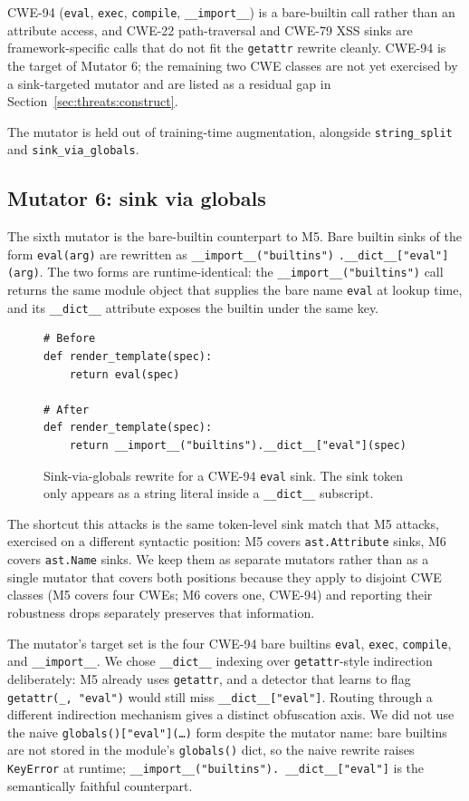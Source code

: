 CWE-94 (\texttt{eval}, \texttt{exec}, \texttt{compile},
\texttt{\_\_import\_\_}) is a bare-builtin call rather than an
attribute access, and CWE-22 path-traversal and CWE-79 XSS sinks
are framework-specific calls that do not fit the
\texttt{getattr} rewrite cleanly. CWE-94 is the target of Mutator 6;
the remaining two CWE classes are not yet exercised by a
sink-targeted mutator and are listed as a residual gap in
Section~\ref{sec:threats:construct}.

The mutator is held out of training-time augmentation, alongside
\texttt{string\_split} and \texttt{sink\_via\_globals}.

\subsection{Mutator 6: sink via globals}
\label{sec:method:svg}

The sixth mutator is the bare-builtin counterpart to M5. Bare
builtin sinks of the form \texttt{eval(arg)} are rewritten as
\texttt{\_\_import\_\_("builtins")} \texttt{.\_\_dict\_\_["eval"](arg)}.
The two forms are runtime-identical: the
\texttt{\_\_import\_\_("builtins")} call returns the same module
object that supplies the bare name \texttt{eval} at lookup time, and
its \texttt{\_\_dict\_\_} attribute exposes the builtin under the
same key.

\begin{figure}[h]
\begin{verbatim}
# Before
def render_template(spec):
    return eval(spec)

# After
def render_template(spec):
    return __import__("builtins").__dict__["eval"](spec)
\end{verbatim}
\caption{Sink-via-globals rewrite for a CWE-94 \texttt{eval} sink.
The sink token only appears as a string literal inside a
\texttt{\_\_dict\_\_} subscript.}
\label{lst:svg}
\end{figure}

The shortcut this attacks is the same token-level sink match that
M5 attacks, exercised on a different syntactic position: M5 covers
\texttt{ast.Attribute} sinks, M6 covers \texttt{ast.Name} sinks. We
keep them as separate mutators rather than as a single mutator that
covers both positions because they apply to disjoint CWE classes
(M5 covers four CWEs; M6 covers one, CWE-94) and reporting their
robustness drops separately preserves that information.

The mutator's target set is the four CWE-94 bare builtins
\texttt{eval}, \texttt{exec}, \texttt{compile}, and
\texttt{\_\_import\_\_}. We chose \texttt{\_\_dict\_\_} indexing
over \texttt{getattr}-style indirection deliberately: M5 already
uses \texttt{getattr}, and a detector that learns to flag
\texttt{getattr(\_, "eval")} would still miss
\texttt{\_\_dict\_\_["eval"]}. Routing through a different
indirection mechanism gives a distinct obfuscation axis. We did not
use the naive \texttt{globals()["eval"](\ldots)} form despite the
mutator name: bare builtins are not stored in the module's
\texttt{globals()} dict, so the naive rewrite raises
\texttt{KeyError} at runtime; \texttt{\_\_import\_\_("builtins").%
\_\_dict\_\_["eval"]} is the semantically faithful counterpart.

